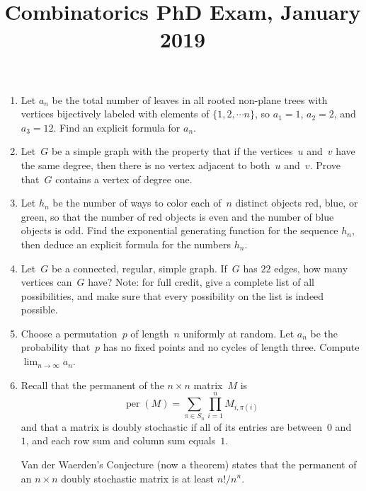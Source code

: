 \documentclass[11pt,letterpaper]{article}
\title{Combinatorics PhD Exam, January 2019}
\author{}
\date{}
\newenvironment{examproblems}[2]{%
  \def\ProblemHeadingTag{#2}%
  \AssignTaggingSocketPlug{block/list/label}{examproblem}%
  \begin{enumerate}%
  \setcounter{enumi}{#1}%
  \renewcommand{\labelenumi}{\textbf{\theenumi.}}%
  \setlength{\topsep}{0.35em}%
  \setlength{\partopsep}{0pt}%
  \setlength{\itemsep}{0.48em}%
  \setlength{\parsep}{0.18em}%
}{\end{enumerate}}
\begin{document}
\maketitle
\thispagestyle{empty}
\begin{examproblems}{0}{H2}
\def\ProblemHeadingText{Problem 1.}
\item
Let \(a_n\) be the total number of leaves in all rooted non-plane trees with vertices bijectively labeled with elements of \(\{1,2,\cdots n\}\), so \(a_1=1\), \(a_2=2\), and \(a_3=12\). Find an explicit formula for \(a_n\).
\def\ProblemHeadingText{Problem 2.}
\item
Let~\(G\) be a simple graph with the property that if the vertices~\(u\) and~\(v\) have the same degree, then there is no vertex adjacent to both~\(u\) and~\(v\). Prove that~\(G\) contains a vertex of degree one.
\def\ProblemHeadingText{Problem 3.}
\item
Let \(h_n\) be the number of ways to color each of~\(n\) distinct objects red, blue, or green, so that the number of red objects is even and the number of blue objects is odd. Find the exponential generating function for the sequence \(h_n\), then deduce an explicit formula for the numbers \(h_n\).
\def\ProblemHeadingText{Problem 4.}
\item
Let~\(G\) be a connected, regular, simple graph. If~\(G\) has \(22\) edges, how many vertices can~\(G\) have? Note: for full credit, give a complete list of all possibilities, and make sure that every possibility on the list is indeed possible.
\def\ProblemHeadingText{Problem 5.}
\item
Choose a permutation~\(p\) of length~\(n\) uniformly at random. Let \(a_n\) be the probability that~\(p\) has no fixed points and no cycles of length three. Compute \(\lim_{n\to\infty} a_n\).
\def\ProblemHeadingText{Problem 6.}
\item
Recall that the permanent of the \(n\times n\) matrix~\(M\) is
\[
\operatorname{per}(M)=\sum_{\pi\in S_n}\prod_{i=1}^n M_{i,\pi(i)}
\]
 and that a matrix is doubly stochastic if all of its entries are between~\(0\) and~\(1\), and each row sum and column sum equals~\(1\).

\par
Van der Waerden’s Conjecture (now a theorem) states that the permanent of an \(n\times n\) doubly stochastic matrix is at least \(n!/n^n\).


\end{examproblems}
\end{document}

